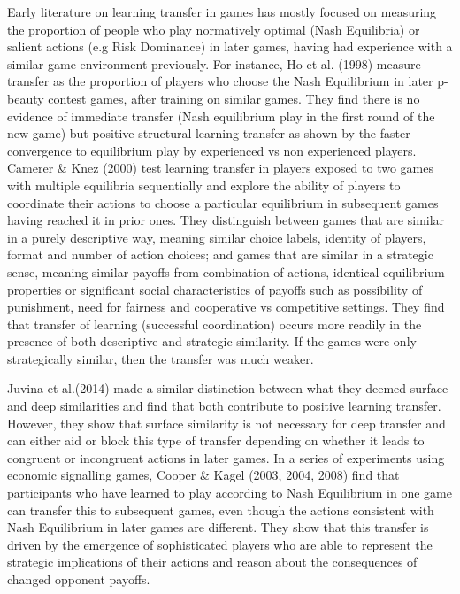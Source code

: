 \documentclass[man,floatsintext]{apa6}
\begin{document}
Early literature on learning transfer in games has mostly focused on measuring the proportion of people who play normatively optimal (Nash Equilibria) or salient actions (e.g Risk Dominance) in later games, having had experience with a similar game environment previously. For instance, Ho et al. (1998) measure transfer as the proportion of players who choose the Nash Equilibrium in later p-beauty contest games, after training on similar games. They find there is no evidence of immediate transfer (Nash equilibrium play in the first round of the new game) but positive structural learning transfer as shown by the faster convergence to equilibrium play by experienced vs non experienced players. Camerer \& Knez (2000) test learning transfer in players exposed to two games with multiple equilibria sequentially and explore the ability of players to coordinate their actions to choose a particular equilibrium in subsequent games having reached it in prior ones. They distinguish between games that are similar in a purely descriptive way, meaning similar choice labels, identity of players, format and number of action choices; and games that are similar in a strategic sense, meaning similar payoffs from combination of actions, identical equilibrium properties or significant social characteristics of payoffs such as possibility of punishment, need for fairness and cooperative vs competitive settings. They find that transfer of learning (successful coordination) occurs more readily in the presence of both descriptive and strategic similarity. If the games were only strategically similar, then the transfer was much weaker.

Juvina et al.(2014) made a similar distinction between what they deemed surface and deep similarities and find that both contribute to positive learning transfer. However, they show that surface similarity is not necessary for deep transfer and can either aid or block this type of transfer depending on whether it leads to congruent or incongruent actions in later games. In a series of experiments using economic signalling games, Cooper \& Kagel (2003, 2004, 2008) find that participants who have learned to play according to Nash Equilibrium in one game can transfer this to subsequent games, even though the actions consistent with Nash Equilibrium in later games are different. They show that this transfer is driven by the emergence of sophisticated players who are able to represent the strategic implications of their actions and reason about the consequences of changed opponent payoffs.
\end{document}

